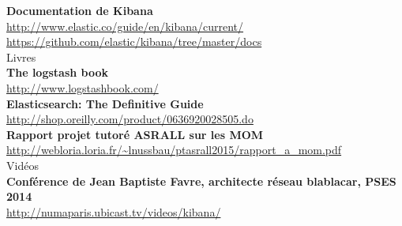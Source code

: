 \textbf{Documentation de Kibana}\\
\url{http://www.elastic.co/guide/en/kibana/current/}\\
\url{https://github.com/elastic/kibana/tree/master/docs}\\[3mm]


{\huge Livres}\\[5mm]

\textbf{The logstash book}\\
\url{http://www.logstashbook.com/}\\[1mm]

\textbf{Elasticsearch: The Definitive Guide}\\
\url{http://shop.oreilly.com/product/0636920028505.do}\\[1mm]

\textbf{Rapport projet tutoré ASRALL sur les MOM}\\
\url{http://webloria.loria.fr/~lnussbau/ptasrall2015/rapport\_a\_mom.pdf}\\[3mm]


{\huge Vidéos}\\[5mm]

\textbf{Conférence de Jean Baptiste Favre, architecte réseau blablacar, PSES 2014}\\
\url{http://numaparis.ubicast.tv/videos/kibana/}\\[3mm]
